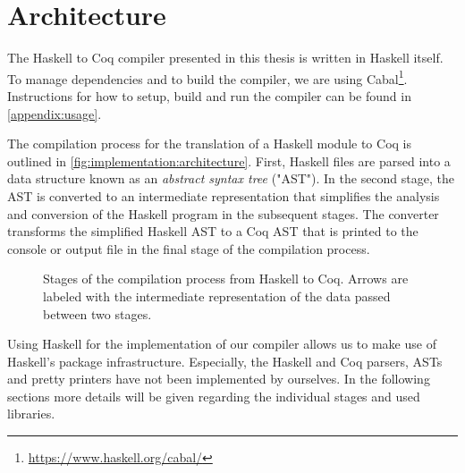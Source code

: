 \section{Architecture} \label{sec:implementation:architecture}
The Haskell to Coq compiler presented in this thesis is written in Haskell itself.
To manage dependencies and to build the compiler, we are using Cabal\footnote{\url{https://www.haskell.org/cabal/}}.
Instructions for how to setup, build and run the compiler can be found in \autoref{appendix:usage}.

The compilation process for the translation of a Haskell module to Coq is outlined in \autoref{fig:implementation:architecture}.
First, Haskell files are parsed into a data structure known as an \textit{abstract syntax tree} ("AST").
In the second stage, the AST is converted to an intermediate representation that simplifies the analysis and conversion of the Haskell program in the subsequent stages.
The converter transforms the simplified Haskell AST to a Coq AST that is printed to the console or output file in the final stage of the compilation process.

\begin{figure}[p]
  \caption{
    Stages of the compilation process from Haskell to Coq.
    Arrows are labeled with the intermediate representation of the data passed between two stages.
  }
  \label{fig:implementation:architecture}
\end{figure}

Using Haskell for the implementation of our compiler allows us to make use of Haskell's package infrastructure.
Especially, the Haskell and Coq parsers, ASTs and pretty printers have not been implemented by ourselves.
In the following sections more details will be given regarding the individual stages and used libraries.
